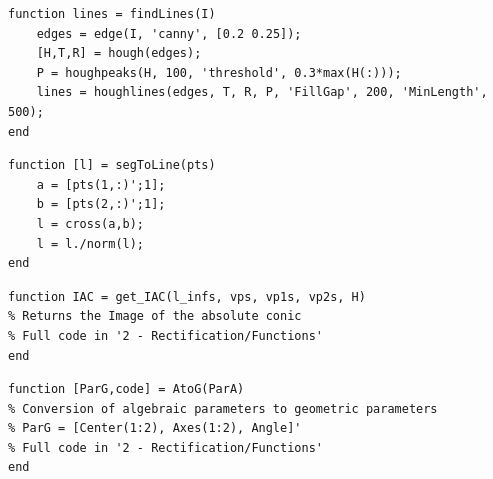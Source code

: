 \documentclass[12pt,a4paper]{article}
\begin{document}
\begin{verbatim}
function lines = findLines(I)
    edges = edge(I, 'canny', [0.2 0.25]);
    [H,T,R] = hough(edges);
    P = houghpeaks(H, 100, 'threshold', 0.3*max(H(:)));
    lines = houghlines(edges, T, R, P, 'FillGap', 200, 'MinLength', 500);
end
\end{verbatim}

\begin{verbatim}
function [l] = segToLine(pts)
    a = [pts(1,:)';1];
    b = [pts(2,:)';1];
    l = cross(a,b);
    l = l./norm(l);
end
\end{verbatim}

\begin{verbatim}
function IAC = get_IAC(l_infs, vps, vp1s, vp2s, H)
% Returns the Image of the absolute conic
% Full code in '2 - Rectification/Functions'
end
\end{verbatim}

\begin{verbatim}
function [ParG,code] = AtoG(ParA)
% Conversion of algebraic parameters to geometric parameters
% ParG = [Center(1:2), Axes(1:2), Angle]'
% Full code in '2 - Rectification/Functions'
end
\end{verbatim}

\pagebreak


\end{document}
